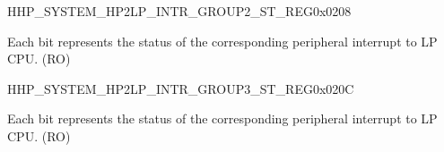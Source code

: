 {\begin{register}{H}{HP\_SYSTEM\_HP2LP\_INTR\_GROUP2\_ST\_REG}{0x0208}\label{regdesc:HPSYSTEMHP2LPINTRGROUP2STREG}
%
\regnewline%
\begin{regdesc}\begin{reglist}
\label{fielddesc:HPSYSTEMH2LPINTRGROUP2ST}\item [HP\_SYSTEM\_H2LP\_INTR\_GROUP2\_ST] Each bit represents the status of the corresponding peripheral interrupt to LP CPU. (RO)
\end{reglist}\end{regdesc}
\end{register}


\begin{register}{H}{HP\_SYSTEM\_HP2LP\_INTR\_GROUP3\_ST\_REG}{0x020C}\label{regdesc:HPSYSTEMHP2LPINTRGROUP3STREG}
%
%
\regnewline%
\begin{regdesc}\begin{reglist}
\label{fielddesc:HPSYSTEMH2LPINTRGROUP3ST}\item [HP\_SYSTEM\_H2LP\_INTR\_GROUP3\_ST] Each bit represents the status of the corresponding peripheral interrupt to LP CPU. (RO)
\end{reglist}\end{regdesc}
\end{register}

}